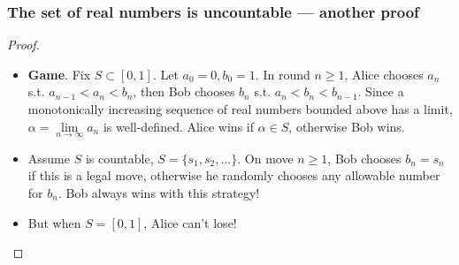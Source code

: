 \documentclass[UTF8,11pt,colorlinks,compress,openany]{beamer}%
\begin{document}
\begin{frame}\frametitle{The set of real numbers is uncountable --- another proof}
	\begin{proof}
		\begin{itemize}
			\item \textbf{Game}. Fix $S\subset [0,1]$. Let $a_0=0, b_0=1$. In round $n\geq 1$, Alice chooses $a_n$ s.t. $a_{n-1}<a_n<b_n$, then Bob chooses $b_n$ s.t. $a_n<b_n<b_{n-1}$. Since a monotonically increasing sequence of real numbers bounded above has a limit, $\alpha=\lim\limits_{n\to\infty}a_n$ is well-defined. Alice wins if $\alpha\in S$, otherwise Bob wins.
			\item Assume $S$ is countable, $S=\{s_1, s_2, \dots\}$. On move $n\geq 1$, Bob chooses $b_n=s_n$ if this is a legal move, otherwise he randomly chooses any allowable number for $b_n$. Bob always wins with this strategy!
			\item But when $S=[0,1]$, Alice can't lose!
		\end{itemize}
	\end{proof}
\end{frame}
\end{document}
